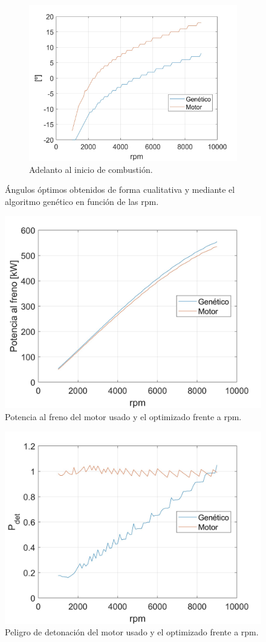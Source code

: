 \begin{figure}[H]
    \begin{subfigure}[b]{0.45\textwidth}
        \centering
        \includegraphics[width=\linewidth]{Figures/01/opti_AICB.jpg}
        \caption{Adelanto al inicio de combustión.}
        \label{fig:opti_AICB}
    \end{subfigure}
    \caption{Ángulos óptimos obtenidos de forma cualitativa y mediante el algoritmo genético en función de las rpm.}
    \label{fig:opti_angles}
\end{figure}


\begin{figure}[H]
    \centering
    \includegraphics[width=0.6\linewidth]{Figures/01/opti_pot.jpg}
    \caption{Potencia al freno del motor usado y el optimizado frente a rpm.}
    \label{fig:opti_pot}
\end{figure}

\begin{figure}[H]
    \centering
    \includegraphics[width=0.6\linewidth]{Figures/01/opti_pdet.jpg}
    \caption{Peligro de detonación del motor usado y el optimizado frente a rpm.}
    \label{fig:opti_pdet}
\end{figure}

